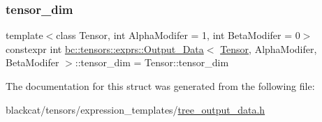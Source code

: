 \subsubsection{\texorpdfstring{tensor\+\_\+dim}{tensor\_dim}}
{\footnotesize\ttfamily template$<$class Tensor, int Alpha\+Modifer = 1, int Beta\+Modifer = 0$>$ \\
constexpr int \hyperlink{structbc_1_1tensors_1_1exprs_1_1Output__Data}{bc\+::tensors\+::exprs\+::\+Output\+\_\+\+Data}$<$ \hyperlink{namespacebc_a659391e47ab612be3ba6c18cf9c89159}{Tensor}, Alpha\+Modifer, Beta\+Modifer $>$\+::tensor\+\_\+dim = Tensor\+::tensor\+\_\+dim\hspace{0.3cm}{\ttfamily [static]}}



The documentation for this struct was generated from the following file\+:\begin{DoxyCompactItemize}
\item 
blackcat/tensors/expression\+\_\+templates/\hyperlink{tree__output__data_8h}{tree\+\_\+output\+\_\+data.\+h}\end{DoxyCompactItemize}
